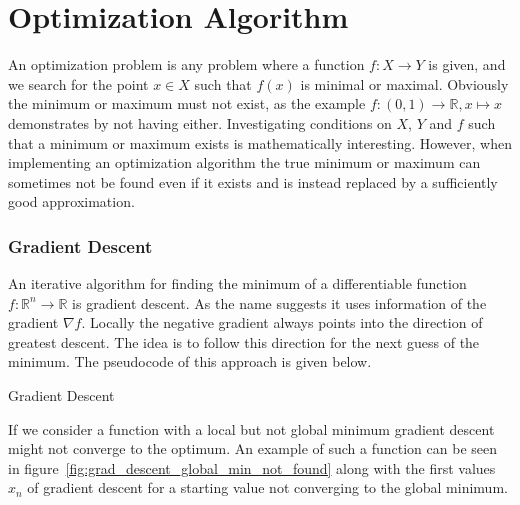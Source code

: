 \chapter{Optimization Algorithm}
\label{chapter:optimization}

An optimization problem is any problem where a function $f:X \rightarrow Y$ is given, and we search for the point $x \in X$ such that $f(x)$ is minimal or maximal. Obviously the minimum or maximum must not exist, as the example $f: (0, 1) \rightarrow \mathbb{R}, x \mapsto x$ demonstrates by not having either. Investigating conditions on $X$, $Y$ and $f$ such that a minimum or maximum exists is mathematically interesting. However, when implementing an optimization algorithm the true minimum or maximum can sometimes not be found even if it exists and is instead replaced by a sufficiently good approximation.

\subsection{Gradient Descent}

An iterative algorithm for finding the minimum of a differentiable function $f: \mathbb{R}^n \rightarrow \mathbb{R}$ is gradient descent. As the name suggests it uses information of the gradient $\nabla f$. Locally the negative gradient always points into the direction of greatest descent. The idea is to follow this direction for the next guess of the minimum. The pseudocode of this approach is given below.

\begin{algorithm}[H] \label{alg:gradient_descent}
	\SetAlgoLined
	\DontPrintSemicolon
	\LinesNumbered
	\caption{Gradient Descent}
	
	\BlankLine
\end{algorithm}
\vspace{1cm}

If we consider a function with a local but not global minimum gradient descent might not converge to the optimum. An example of such a function can be seen in figure~\ref{fig:grad_descent_global_min_not_found} along with the first values $x_n$ of gradient descent for a starting value not converging to the global minimum.

